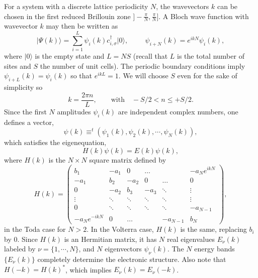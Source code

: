 \documentclass[]{revtex4-1}
\begin{document}
For a system with a discrete lattice periodicity $N$, the wavevectors $k$ can be chosen in the first reduced Brillouin zone $]-\frac{\pi}{N}, \frac{\pi}{N}]$.
  A Bloch wave function with wavevector $k$ may then be written as
 \begin{equation}
 \label{bloch_wave}
 \vert \Psi(k) \rangle=\sum_{i=1}^{L}  \psi_{i}(k) c^{\dagger}_{i,\sigma} \vert 0 \rangle, \hspace{1cm} \psi_{i+N}(k)=e^{ikN}\psi_{i}(k),
 \end{equation}
 where $\vert 0 \rangle$ is the empty state and $L=NS$ (recall that $L$ is the total number of sites and $S$ the number of unit cells). The periodic boundary conditions imply $\psi_{i+L}(k)=\psi_{i}(k)$ so that $e^{ikL}=1$. We will choose $S$ even for the sake of simplicity so
  \begin{equation}
 k= \frac{2\pi n}{L},\quad \quad \text{with} \quad -S/2<n \le +S/2.
 \end{equation}
 Since the first $N$ amplitudes $\psi_{i}(k)$ are independent complex numbers, one defines a vector, $$\psi(k)\equiv ^t(\psi_{1}(k),\psi_{2}(k), \cdots,\psi_{N}(k)),$$  which satisfies the eigenequation,
 \begin{equation}
 \label{eigenequation}
  H(k) \psi(k)=E(k) \psi(k),
  \end{equation}
where $H(k)$ is the $N \times N$ square matrix defined by 
\begin{equation}
 H(k)= \begin{pmatrix}
    b_1 & -a_1 & 0 &\dots &  & -a_{N} e^{ikN} \\
    -a_1 & b_2 & -a_2 & 0 & \dots & 0 \\
    0 & -a_2 & b_3 & -a_3 & \ddots & \vdots \\
      \vdots & \ddots & \ddots & \ddots & \ddots & \vdots \\
    0 & \ddots & \ddots & \ddots & \ddots & -a_{N-1} \\
    -a_{N} e^{-ikN} & 0 & \dots  & &  -a_{N-1} &  b_{N} 
  \end{pmatrix}, \label{eq00}
\end{equation}
in the Toda case for $N>2$. In the Volterra case, $H(k)$ is the same, replacing $b_i$ by $0$. Since $H(k)$ is an Hermitian matrix, it has $N$ real eigenvalues $E_{\nu}(k)$ labeled by $\nu=\{1,\cdots,N\}$, and $N$ eigenvectors $\psi_{\nu}(k)$. The $N$ energy bands $\{E_{\nu}(k)\}$ completely determine the electronic structure. Also note that $H(-k)=H(k)^*$, which implies $E_{\nu}(k)=E_{\nu}(-k)$. 
\end{document}
